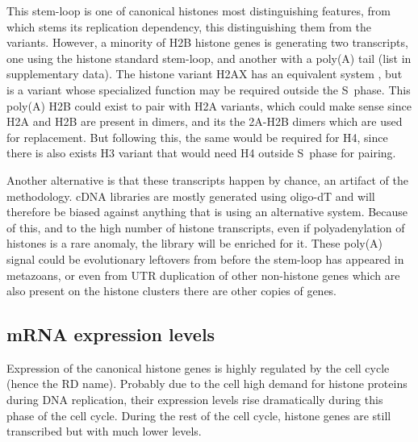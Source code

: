     This stem-loop is one of canonical histones most distinguishing features, from which
    stems its replication dependency, this distinguishing them from the variants.
    However, a minority of H2B histone
    genes is generating two transcripts, one using the histone standard
    stem-loop, and another with a poly(A) tail (list in supplementary data).
    The histone variant H2AX has an equivalent system \citep{HTwoAX-transcripts},
    but is a variant whose
    specialized function may be required outside the S~phase. This poly(A)
    H2B could exist to pair with H2A variants, which could make sense since
    H2A and H2B are present in dimers, and its the 2A-H2B dimers which are
    used for replacement. But following this, the same would be required
    for H4, since there is also exists H3 variant that would need H4 outside
    S~phase for pairing.


    Another alternative is that these transcripts happen by chance, an artifact
    of the methodology. cDNA libraries are mostly generated using oligo-dT
    and will therefore be biased against anything that is using an alternative
    system. Because of this, and to the high number of histone transcripts,
    even if polyadenylation of histones is a rare anomaly, the library will
    be enriched for it.
    These poly(A) signal could be evolutionary leftovers from before the
    stem-loop has appeared in metazoans, or even from UTR duplication of
    other non-histone genes which are also present on the histone clusters
    there are other copies of genes.


  \subsection{mRNA expression levels}
    Expression of the canonical histone genes is highly regulated by
    the cell cycle (hence the RD name). Probably due
    to the cell high demand for histone proteins during DNA replication, their expression levels rise dramatically
    during this phase of the cell cycle. During the rest of the cell cycle, histone genes are still transcribed
    but with much lower levels.

